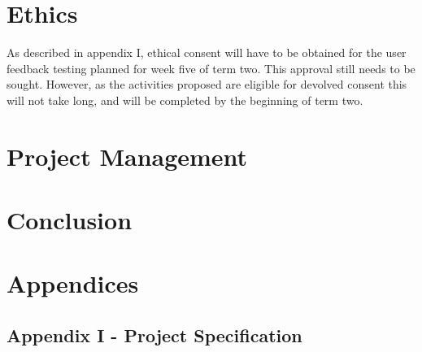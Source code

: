 \documentclass[10pt,a4paper]{report}
\begin{document}
\section*{Ethics}
As described in appendix I, ethical consent will have to be obtained for the user feedback testing planned for week five of term two. This approval still needs to be sought. However, as the activities proposed are eligible for devolved consent this will not take long, and will be completed by the beginning of term two.
\section*{Project Management}
\section*{Conclusion}
\section*{Appendices}
\subsection*{Appendix I - Project Specification}

\end{document}

